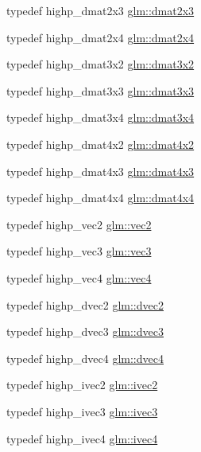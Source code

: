 \begin{DoxyCompactItemize}
\item 
typedef highp\+\_\+dmat2x3 \hyperlink{group__core__types_ga6b5ff9888ca0e468f35b637d4c3a361d}{glm\+::dmat2x3}
\item 
typedef highp\+\_\+dmat2x4 \hyperlink{group__core__types_ga2d1dd4b4925d1ea67539902c820483a0}{glm\+::dmat2x4}
\item 
typedef highp\+\_\+dmat3x2 \hyperlink{group__core__types_ga2db259d2e7921065c5b7d4dca9547960}{glm\+::dmat3x2}
\item 
typedef highp\+\_\+dmat3x3 \hyperlink{group__core__types_gaf3c29c4f75a448f308463e75ca2efd4c}{glm\+::dmat3x3}
\item 
typedef highp\+\_\+dmat3x4 \hyperlink{group__core__types_ga19e745a83cba85f57afa1232276dcc96}{glm\+::dmat3x4}
\item 
typedef highp\+\_\+dmat4x2 \hyperlink{group__core__types_gab3d51ce41e6f0aa267d3e185cee09c44}{glm\+::dmat4x2}
\item 
typedef highp\+\_\+dmat4x3 \hyperlink{group__core__types_gaa4a157ac183c5bd5dcbd555a94b1b505}{glm\+::dmat4x3}
\item 
typedef highp\+\_\+dmat4x4 \hyperlink{group__core__types_ga54d90d4b902d93638b906571af215bb1}{glm\+::dmat4x4}
\item 
typedef highp\+\_\+vec2 \hyperlink{group__core__types_gaa1618f51db67eaa145db101d8c8431d8}{glm\+::vec2}
\item 
typedef highp\+\_\+vec3 \hyperlink{group__core__types_ga1c47e8b3386109bc992b6c48e91b0be7}{glm\+::vec3}
\item 
typedef highp\+\_\+vec4 \hyperlink{group__core__types_ga5881b1b022d7fd1b7218f5916532dd02}{glm\+::vec4}
\item 
typedef highp\+\_\+dvec2 \hyperlink{group__core__types_gae6727259898288cae197724d5f172b3b}{glm\+::dvec2}
\item 
typedef highp\+\_\+dvec3 \hyperlink{group__core__types_ga7f3287f952e6ccb481231368091702ac}{glm\+::dvec3}
\item 
typedef highp\+\_\+dvec4 \hyperlink{group__core__types_ga0824ceed7ec3b2fba89765501c1540b5}{glm\+::dvec4}
\item 
typedef highp\+\_\+ivec2 \hyperlink{group__core__types_ga9e6ce9cfc7919976b318197e18d8a065}{glm\+::ivec2}
\item 
typedef highp\+\_\+ivec3 \hyperlink{group__core__types_ga6e12a4ca00d696f07da1df4eb73e0fe8}{glm\+::ivec3}
\item 
typedef highp\+\_\+ivec4 \hyperlink{group__core__types_gaa4560ddc50320ea8f8a70d5c9c249fea}{glm\+::ivec4}

\end{DoxyCompactItemize}
